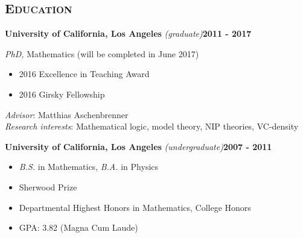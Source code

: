 \documentclass[margin, 10pt]{res} %
\begin{document}
\begin{resume}


\section{\textsc{Education}}

\textbf{University of California, Los Angeles} {\sl (graduate)}\hfill \textbf{2011 - 2017}

{\sl PhD,} Mathematics (will be completed in June 2017)

\begin{itemize}
        \item 2016 Excellence in Teaching Award
        \item 2016 Girsky Fellowship
\end{itemize}

{\sl Advisor}: Matthias Aschenbrenner \\
{\sl Research interests}: Mathematical logic, model theory, NIP theories, VC-density

\textbf{University of California, Los Angeles} {\sl (undergraduate)}\hfill \textbf{2007 - 2011}

\begin{itemize}
	\item {\sl B.S.} in Mathematics, {\sl B.A.} in Physics
	\item Sherwood Prize
	\item Departmental Highest Honors in Mathematics, College Honors
	\item GPA: 3.82 (Magna Cum Laude)
\end{itemize}

 

\end{resume}
\end{document}
